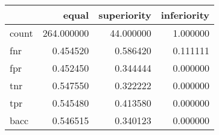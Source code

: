 \begin{tabular}{lrrr}
\toprule
{} &       equal &  superiority &  inferiority \\
\midrule
count &  264.000000 &    44.000000 &     1.000000 \\
fnr   &    0.454520 &     0.586420 &     0.111111 \\
fpr   &    0.452450 &     0.344444 &     0.000000 \\
tnr   &    0.547550 &     0.322222 &     0.000000 \\
tpr   &    0.545480 &     0.413580 &     0.000000 \\
bacc  &    0.546515 &     0.340123 &     0.000000 \\
\bottomrule
\end{tabular}
